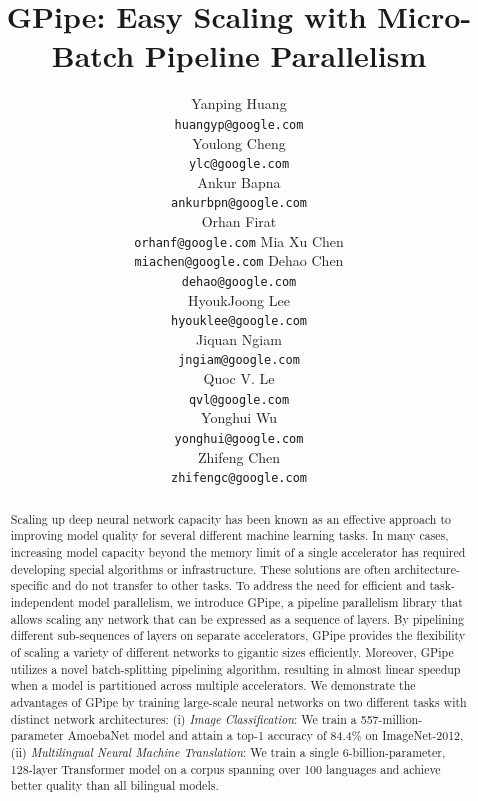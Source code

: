 \documentclass{article}
\def\codename{GPipe}
\begin{document}
\title{\codename{}: Easy Scaling with Micro-Batch Pipeline Parallelism}

\author{
Yanping Huang\\
\texttt{huangyp@google.com} \\
\And
Youlong Cheng\\
\texttt{ylc@google.com} \\
\And 
Ankur Bapna \\
\texttt{ankurbpn@google.com} \\
\And
Orhan Firat \\
\texttt{orhanf@google.com}
\And
Mia Xu Chen \\
\texttt{miachen@google.com}
\And
Dehao Chen\\
\texttt{dehao@google.com} \\
\And
HyoukJoong Lee\\
\texttt{hyouklee@google.com} \\
\And
Jiquan Ngiam\\
\texttt{jngiam@google.com}\\
\And
Quoc V. Le \\
\texttt{qvl@google.com}\\
\And
Yonghui Wu\\
\texttt{yonghui@google.com} \\
\And
Zhifeng Chen\\
\texttt{zhifengc@google.com}\\
}

\maketitle

\begin{abstract}
Scaling up deep neural network capacity has been known as an effective approach to improving model quality for several different machine learning tasks. In many cases, increasing model capacity beyond the memory limit of a single accelerator has required developing special algorithms or infrastructure. These solutions are often architecture-specific and do not transfer to other tasks. To address the need for efficient and task-independent model parallelism, we introduce \codename{}, a pipeline parallelism library that allows scaling any network that can be expressed as a sequence of layers. By pipelining different sub-sequences of layers on separate accelerators, \codename{} provides the flexibility of scaling a variety of different networks to gigantic sizes efficiently. Moreover, \codename{} utilizes a novel batch-splitting pipelining algorithm, resulting in almost linear speedup when a model is partitioned across multiple accelerators. We demonstrate the advantages of \codename{} by training large-scale neural networks on two different tasks with distinct network architectures: (i) \textit{Image Classification}: We train a 557-million-parameter AmoebaNet model and attain a top-1 accuracy of 84.4\% on ImageNet-2012, (ii) \textit{Multilingual Neural Machine Translation}: We train a single 6-billion-parameter, 128-layer Transformer model on a corpus spanning over 100 languages and achieve better quality than all bilingual models.
\end{abstract}
\end{document}
